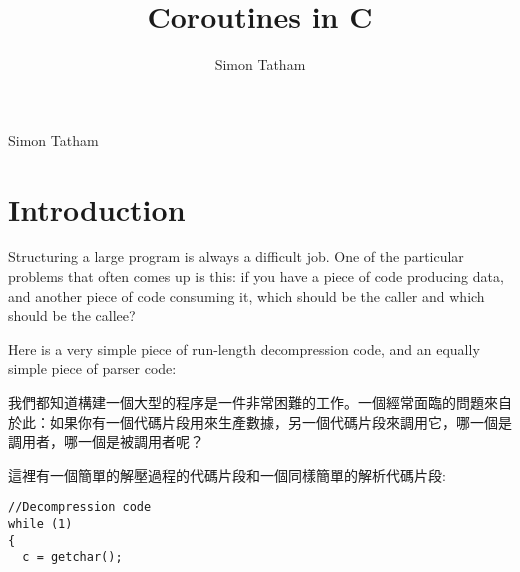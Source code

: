 \documentclass[12pt]{article}
\title{Coroutines in C}
\author{Simon Tatham}
\begin{document}
\maketitle

%

\newpage
\tableofcontents
\newpage

\begin{CJK}{UTF8}{bsmi} %
\begin{comment}
.oO Phrack 49 Oo.

Volume Seven, Issue Forty Nine File 14 of 16

BugTraq, r00t, and Underground.Org

 bring you

\end{comment}

\begin{center}
Simon Tatham

\end{center}
\section{Introduction}

 Structuring a large program is always a difficult job. One of the particular problems that often comes up is this: if you have a piece of code producing data, and another piece of code consuming it, which should be the caller and which should be the callee?

 Here is a very simple piece of run-length decompression code, and an equally simple piece of parser code: 

我們都知道構建一個大型的程序是一件非常困難的工作。一個經常面臨的問題來自於此：如果你有一個代碼片段用來生產數據，另一個代碼片段來調用它，哪一個是調用者，哪一個是被調用者呢？

這裡有一個簡單的解壓過程的代碼片段和一個同樣簡單的解析代碼片段: 

\newpage
\begin{multicols}{2}

\begin{lstlisting}[caption=decompression, basicstyle=\footnotesize, breaklines=true, frame=single,frameround=tttt]
//Decompression code
while (1) 
{
  c = getchar();


\end{lstlisting}
\end{multicols}
\end{CJK}
\end{document}
